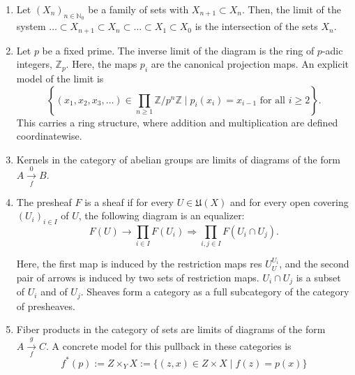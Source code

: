 

\begin{example}[Limits]
    \begin{enumerate}
        \item Let $\left(X_n\right)_{n \in \mathbb{N}_0}$ be a family of sets with $X_{n+1} \subset X_n$. Then, the limit of the system
        $
        \ldots \subset X_{n+1} \subset X_n \subset \ldots \subset X_1 \subset X_0
        $
        is the intersection of the sets $X_n$.
        \item Let $p$ be a fixed prime. The inverse limit of the diagram
        is the ring of $p$-adic integers, $\mathbb{Z}_p$. Here, the maps $p_i$ are the canonical projection maps. An explicit model of the limit is
        $$
        \left\{\left(x_1, x_2, x_3, \ldots\right) \in \prod_{n \geq 1} \mathbb{Z} / p^n \mathbb{Z} \mid p_i\left(x_i\right)=x_{i-1} \text { for all } i \geq 2\right\} .
        $$
        This carries a ring structure, where addition and multiplication are defined coordinatewise.
        \item Kernels in the category of abelian groups are limits of diagrams of the form $A \underset{f}{\stackrel{0}{\longrightarrow}} B$.
        \item The presheaf $F$ is a sheaf if for every $U \in \mathfrak{U}(X)$ and for every open covering $\left(U_i\right)_{i \in I}$ of $U$, the following diagram is an equalizer:
        $$
        F(U) \longrightarrow \prod_{i \in I} F\left(U_i\right) \Longrightarrow \prod_{i, j \in I} F\left(U_i \cap U_j\right) .
        $$
        
        Here, the first map is induced by the restriction maps res $U_U^{U_i}$, and the second pair of arrows is induced by two sets of restriction maps. $U_i \cap U_j$ is a subset of $U_i$ and of $U_j$.
        Sheaves form a category as a full subcategory of the category of presheaves.
        \item Fiber products in the category of sets are limits of diagrams of the form $A \underset{f}{\stackrel{g}{\longrightarrow}} C$. A concrete model for this pullback in these categories is $$f^*(p):=Z \times_Y X:=\{(z, x) \in Z \times X \mid f(z)=p(x)\}$$
    \end{enumerate}
\end{example}


